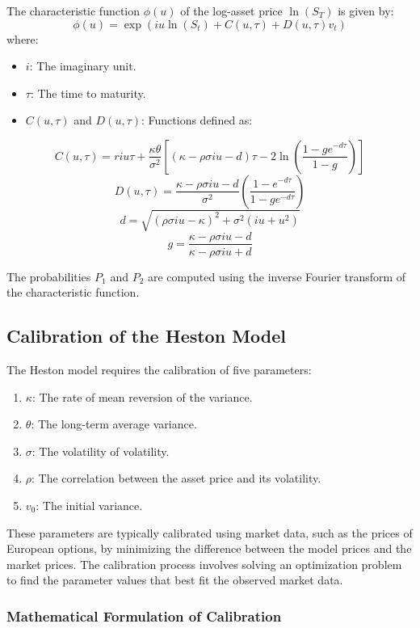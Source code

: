 \documentclass[11pt, oneside, a4paper, titlepage]{report}
\begin{document}
The characteristic function \( \phi(u) \) of the log-asset price \( \ln(S_T) \) is given by:
\[
\phi(u) = \exp\left( i u \ln(S_t) + C(u, \tau) + D(u, \tau) v_t \right)
\]
where:
\begin{itemize}
    \item \( i \): The imaginary unit.
    \item \( \tau \): The time to maturity.
    \item \( C(u, \tau) \) and \( D(u, \tau) \): Functions defined as:
\end{itemize}
\[
C(u, \tau) = r i u \tau + \frac{\kappa \theta}{\sigma^2} \left[ (\kappa - \rho \sigma i u - d) \tau - 2 \ln\left( \frac{1 - g e^{-d \tau}}{1 - g} \right) \right]
\]
\[
D(u, \tau) = \frac{\kappa - \rho \sigma i u - d}{\sigma^2} \left( \frac{1 - e^{-d \tau}}{1 - g e^{-d \tau}} \right)
\]
\[
d = \sqrt{(\rho \sigma i u - \kappa)^2 + \sigma^2 (i u + u^2)}
\]
\[
g = \frac{\kappa - \rho \sigma i u - d}{\kappa - \rho \sigma i u + d}
\]

The probabilities \( P_1 \) and \( P_2 \) are computed using the inverse Fourier transform of the characteristic function.

\subsection{Calibration of the Heston Model}

The Heston model requires the calibration of five parameters:
\begin{enumerate}
    \item \( \kappa \): The rate of mean reversion of the variance.
    \item \( \theta \): The long-term average variance.
    \item \( \sigma \): The volatility of volatility.
    \item \( \rho \): The correlation between the asset price and its volatility.
    \item \( v_0 \): The initial variance.
\end{enumerate}

These parameters are typically calibrated using market data, such as the prices of European options, by minimizing the difference between the model prices and the market prices. The calibration process involves solving an optimization problem to find the parameter values that best fit the observed market data.

\subsubsection{Mathematical Formulation of Calibration}
\end{document}
